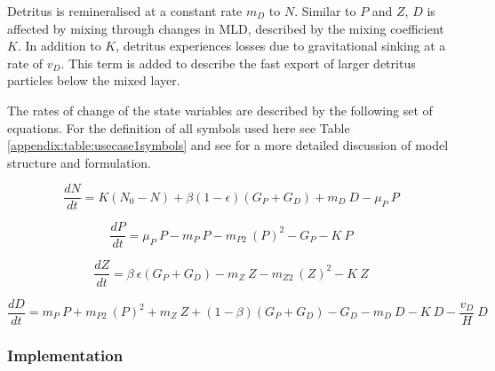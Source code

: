 \documentclass[journal abbreviation, manuscript]{copernicus}
\begin{document}
Detritus is remineralised at a constant rate $m_D$ to $N$. Similar to $P$ and $Z$, $D$ is affected by mixing through changes in MLD, described by the mixing coefficient $K$. In addition to $K$, detritus experiences losses due to gravitational sinking at a rate of $v_D$. This term is added to describe the fast export of larger detritus particles below the mixed layer. 

The rates of change of the state variables are described by the following set of equations. For the definition of all symbols used here see Table \ref{appendix:table:usecase1symbols} and see \citet{Anderson2015c} for a more detailed discussion of model structure and formulation.

\begin{equation}
    \frac{d N}{d t} = 
    K (N_0 - N) %
    + \beta(1 - \epsilon)(G_P + G_D) %
    + m_D \ D %
    - \mu_{P} \ P %
\end{equation}

\begin{equation}
    \frac{d P}{d t} =
    \mu_{P} \ P  %
    - m_P \ P %
    - m_{P2} \ (P)^2 %
    - G_P %
    - K \ P %
\end{equation}

\begin{equation}
    \frac{d Z}{d t} =
    \beta \ \epsilon(G_P + G_D) %
    - m_Z \ Z %
    - m_{Z2} \ (Z)^2 %
    - K \ Z %
\end{equation}

\begin{equation}
    \frac{d D}{d t} = 
    m_P \ P %
    + m_{P2} \ (P)^2 %
    + m_Z \ Z %
    + (1 - \beta)(G_P + G_D) %
    - G_D %
    - m_D \ D %
    - K \ D %
    - \frac{v_D}{H} \ D %
\end{equation}


\subsubsection{Implementation}
\end{document}
